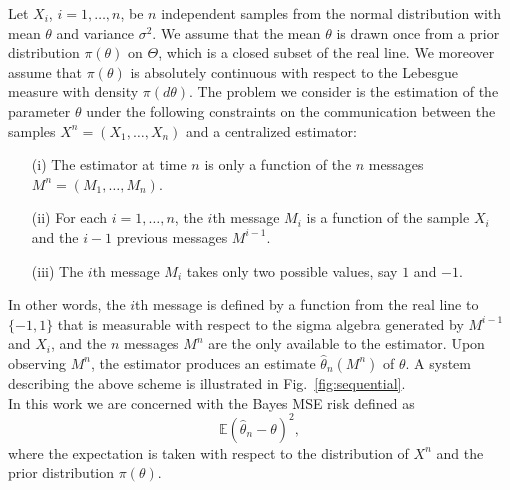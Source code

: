 \documentclass[letterpaper, conference,9pt]{IEEEtran}      %
\begin{document}
Let $X_i$, $i=1,\ldots,n$, be $n$ independent samples from the normal distribution with mean $\theta$ and variance $\sigma^2$. 
We assume that the mean $\theta$ is drawn once from a prior distribution $\pi(\theta)$ on $\Theta$, which is a closed subset of the real line. We moreover assume that $\pi(\theta)$ is absolutely continuous with respect to the Lebesgue measure with density $\pi(d\theta)$. The problem we consider is the estimation of the parameter $\theta$ under the following constraints on the communication between the samples $X^n = (X_1,\ldots,X_n)$ and a centralized estimator: 
\begin{itemize}
\item[(i)] The estimator at time $n$ is only a function of the $n$ messages $M^n = \left(M_1,\ldots,M_n \right)$.
\item[(ii)] For each $i=1,\ldots,n$, the $i$th message $M_i$ is a function of the sample $X_i$ and the $i-1$ previous messages $M^{i-1}$.
\item[(iii)] The $i$th message $M_i$ takes only two possible values, say $1$ and $-1$. 
\end{itemize}
In other words, the $i$th message is defined by a function from the real line to $\{-1,1\}$ that is measurable with respect to the sigma algebra generated by $M^{i-1}$ and $X_i$, and the $n$ messages $M^n$ are the only available to the estimator. Upon observing $M^n$, the estimator produces an estimate $\widehat{\theta}_n(M^n)$ of $\theta$. A system describing the above scheme is illustrated in Fig.~\ref{fig:sequential}. \\

In this work we are concerned with the Bayes MSE risk defined as
\begin{equation}
\label{eq:error_def}
\mathbb E\left(\widehat{\theta}_n - \theta \right)^2,
\end{equation}
where the expectation is taken with respect to the distribution of $X^n$ and the prior distribution $\pi(\theta)$. \\
\end{document}
